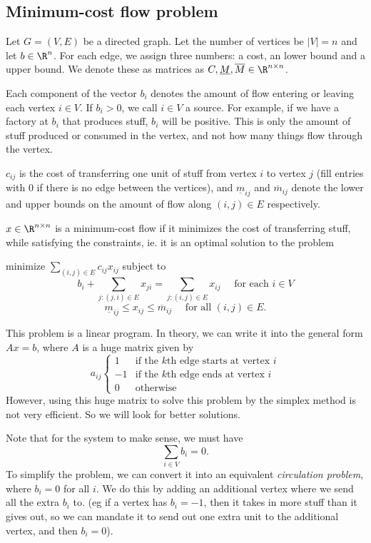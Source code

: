 \documentclass[a4paper]{article}
\begin{document}
\subsection{Minimum-cost flow problem}
Let $G = (V, E)$ be a directed graph. Let the number of vertices be $|V| = n$ and let $b\in \R^n$. For each edge, we assign three numbers: a cost, an lower bound and a upper bound. We denote these as matrices as $C, \underline{M}, \overline{M}\in \R^{n\times n}$.

Each component of the vector $b_i$ denotes the amount of flow entering or leaving each vertex $i\in V$. If $b_i > 0$, we call $i\in V$ a source. For example, if we have a factory at $b_i$ that produces stuff, $b_i$ will be positive. This is only the amount of stuff produced or consumed in the vertex, and not how many things flow through the vertex.

$c_{ij}$ is the cost of transferring one unit of stuff from vertex $i$ to vertex $j$ (fill entries with $0$ if there is no edge between the vertices), and $\underline{m}_{ij}$ and $\overline{m}_{ij}$ denote the lower and upper bounds on the amount of flow along $(i, j)\in E$ respectively.

$x\in \R^{n\times n}$ is a minimum-cost flow if it minimizes the cost of transferring stuff, while satisfying the constraints, ie. it is an optimal solution to the problem
\begin{center}
  minimize $\displaystyle\sum_{(i, j)\in E}c_{ij}x_{ij}$ subject to
  \[
    b_i + \sum_{j: (j, i)\in E} x_{ji} = \sum_{j: (i, j)\in E}x_{ij}\quad\text{ for each }i\in V
  \]
  \[
    \underline{m}_{ij} \leq x_{ij}\leq \overline{m}_{ij}\quad\text{ for all }(i, j) \in E.
  \]
\end{center}
This problem is a linear program. In theory, we can write it into the general form $Ax = b$, where $A$ is a huge matrix given by
\[
  a_{ij}
  \begin{cases}
    1 & \text{if the $k$th edge starts at vertex }i\\
    -1 & \text{if the $k$th edge ends at vertex }i\\
    0 & \text{otherwise}
  \end{cases}
\]
However, using this huge matrix to solve this problem by the simplex method is not very efficient. So we will look for better solutions.

Note that for the system to make sense, we must have
\[
  \sum_{i\in V}b_i = 0.
\]
To simplify the problem, we can convert it into an equivalent \emph{circulation problem}, where $b_i = 0$ for all $i$. We do this by adding an additional vertex where we send all the extra $b_i$ to. (eg if a vertex has $b_i = -1$, then it takes in more stuff than it gives out, so we can mandate it to send out one extra unit to the additional vertex, and then $b_i = 0$).
\end{document}
